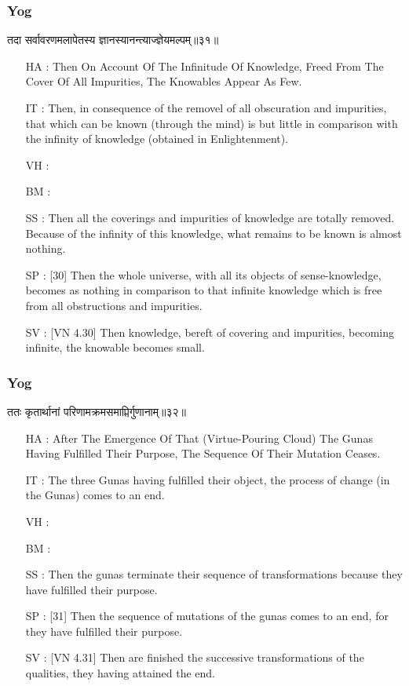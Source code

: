 \begin{frame}[fragile]\frametitle{Yog}
\begin{sanskrit}
तदा सर्वावरणमलापेतस्य ज्ञानस्यानन्त्याज्ज्ञेयमल्पम्॥३१॥
\end{sanskrit}

	\begin{itemize}
	\item [HA]: Then On Account Of The Infinitude Of Knowledge, Freed From The Cover Of All Impurities, The Knowables Appear As Few.
	\item [IT]: Then, in consequence of the removel of all obscuration and impurities, that which can be known (through the mind) is but little in comparison with the infinity of knowledge (obtained in Enlightenment).
	\item [VH]: 
	\item [BM]: 
	\item [SS]: Then all the coverings and impurities of knowledge are totally removed. Because of the infinity of this knowledge, what remains to be known is almost nothing.
	\item [SP]: [30] Then the whole universe, with all its objects of sense-knowledge, becomes as nothing in comparison to that infinite knowledge which is free from all obstructions and impurities.
	\item [SV]: [VN 4.30] Then knowledge, bereft of covering and impurities, becoming infinite, the knowable becomes small. 
	\end{itemize}
\end{frame}



\begin{frame}[fragile]\frametitle{Yog}
\begin{sanskrit}
ततः कृतार्थानां परिणामक्रमसमाप्तिर्गुणानाम्॥३२॥
\end{sanskrit}


	\begin{itemize}
	\item [HA]: After The Emergence Of That (Virtue-Pouring Cloud) The Gunas Having Fulfilled Their Purpose, The Sequence Of Their Mutation Ceases.
	\item [IT]: The three Gunas having fulfilled their object, the process of change (in the Gunas) comes to an end.
	\item [VH]: 
	\item [BM]: 
	\item [SS]: Then the gunas terminate their sequence of transformations because they have fulfilled their purpose.
	\item [SP]: [31] Then the sequence of mutations of the gunas comes to an end, for they have fulfilled their purpose.
	\item [SV]: [VN 4.31] Then are finished the successive transformations of the qualities, they having attained the end. 
	\end{itemize}
\end{frame}



